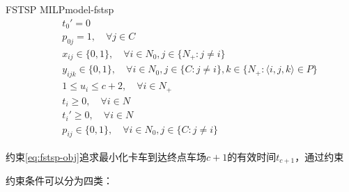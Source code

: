 {\begin{model}{FSTSP MILP}{model-fstsp}
\begin{align}
    \quad & t_0'= 0\label{eq:drone-start-time}\\
    \quad & p_{0j} = 1, \quad \forall j \in C\label{eq:drone-start-order}\\
    \quad & x_{ij} \in \{0, 1\}, \quad \forall i \in N_0, j \in \{N_{+}:j \neq i\}\label{eq:x-bound}\\
    \quad & y_{ijk} \in \{0, 1\}, \quad \forall i \in N_0, j \in \{C:j \neq i\}, k \in \{N_{+}:\langle i,j,k \rangle \in P\}\label{eq:y-bound}\\
    \quad & 1 \leq u_i \leq c+2, \quad \forall i \in N_{+}\label{eq:u-bound}\\
    \quad & t_i \geq 0, \quad \forall i \in N\label{eq:truck-time-bound}\\
    \quad & t_i' \geq 0, \quad \forall i \in N\label{eq:drone-time-bound}\\
    \quad & p_{ij}\in \{0, 1\}, \quad \forall i \in N_0, j \in \{C: j \neq i\}\label{eq:drone-order-bound}
\end{align}
\end{model}
}

约束\ref{eq:fstsp-obj}追求最小化卡车到达终点车场$c+1$的有效时间$t_{c+1}$，通过约束

约束条件可以分为四类\cite{zhihu-murray2015}：

